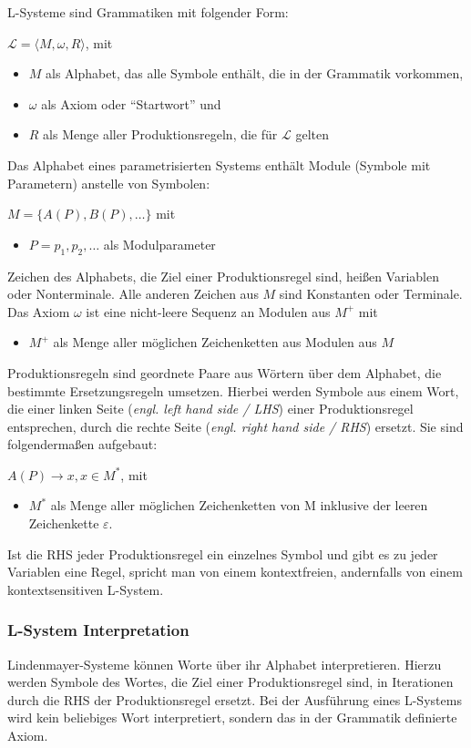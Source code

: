 L-Systeme sind Grammatiken mit folgender Form:
\begin{center}
    $\mathcal{L}=\langle M,\omega,R \rangle$, mit
    \begin{itemize}
        \item $M$ als Alphabet, das alle Symbole enthält, die in der Grammatik vorkommen,
        \item $\omega$ als Axiom oder "`Startwort"' und
        \item $R$ als Menge aller Produktionsregeln, die für $\mathcal{L}$ gelten
    \end{itemize}
\end{center}
Das Alphabet eines parametrisierten Systems enthält Module (Symbole mit Parametern) anstelle von Symbolen:
\begin{center}
    $M=\{A(P),B(P),\dots\}$ mit
    \begin{itemize}
        \item $P=p_1,p_2,\dots$ als Modulparameter
    \end{itemize}
\end{center}
Zeichen des Alphabets, die Ziel einer Produktionsregel sind, heißen Variablen oder Nonterminale.
Alle anderen Zeichen aus $M$ sind Konstanten oder Terminale.
Das Axiom $\omega$ ist eine nicht-leere Sequenz an Modulen aus $M^+$ mit
\begin{itemize}
    \item $M^+$ als Menge aller möglichen Zeichenketten aus Modulen aus $M$
\end{itemize}
Produktionsregeln sind geordnete Paare aus Wörtern über dem Alphabet, die bestimmte Ersetzungsregeln umsetzen.
Hierbei werden Symbole aus einem Wort, die einer linken Seite (\textit{engl. left hand side / LHS}) einer
Produktionsregel entsprechen, durch die rechte Seite (\textit{engl. right hand side / RHS}) ersetzt.
Sie sind folgendermaßen aufgebaut:
\begin{center}
    $A(P)\rightarrow x,x\in M^*$, mit
    \begin{itemize}
        \item $M^*$ als Menge aller möglichen Zeichenketten von M inklusive der leeren Zeichenkette $\varepsilon$.
    \end{itemize}
\end{center}
Ist die RHS jeder Produktionsregel ein einzelnes Symbol und gibt es zu jeder Variablen eine Regel, spricht man
von einem kontextfreien, andernfalls von einem kontextsensitiven L-System.

\subsubsection*{L-System Interpretation}
Lindenmayer-Systeme können Worte über ihr Alphabet interpretieren.
Hierzu werden Symbole des Wortes, die Ziel einer Produktionsregel sind, in Iterationen durch die RHS
der Produktionsregel ersetzt.
Bei der Ausführung eines L-Systems wird kein beliebiges Wort interpretiert, sondern das in der
Grammatik definierte Axiom.

